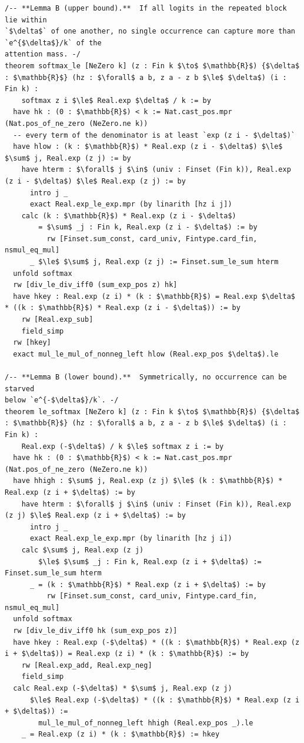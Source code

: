 \documentclass[11pt]{article}
\begin{document}
\begin{lstlisting}
/-- **Lemma B (upper bound).**  If all logits in the repeated block lie within
`$\delta$` of one another, no single occurrence can capture more than `e^{$\delta$}/k` of the
attention mass. -/
theorem softmax_le [NeZero k] (z : Fin k $\to$ $\mathbb{R}$) {$\delta$ : $\mathbb{R}$} (hz : $\forall$ a b, z a - z b $\le$ $\delta$) (i : Fin k) :
    softmax z i $\le$ Real.exp $\delta$ / k := by
  have hk : (0 : $\mathbb{R}$) < k := Nat.cast_pos.mpr (Nat.pos_of_ne_zero (NeZero.ne k))
  -- every term of the denominator is at least `exp (z i - $\delta$)`
  have hlow : (k : $\mathbb{R}$) * Real.exp (z i - $\delta$) $\le$ $\sum$ j, Real.exp (z j) := by
    have hterm : $\forall$ j $\in$ (univ : Finset (Fin k)), Real.exp (z i - $\delta$) $\le$ Real.exp (z j) := by
      intro j _
      exact Real.exp_le_exp.mpr (by linarith [hz i j])
    calc (k : $\mathbb{R}$) * Real.exp (z i - $\delta$)
        = $\sum$ _j : Fin k, Real.exp (z i - $\delta$) := by
          rw [Finset.sum_const, card_univ, Fintype.card_fin, nsmul_eq_mul]
      _ $\le$ $\sum$ j, Real.exp (z j) := Finset.sum_le_sum hterm
  unfold softmax
  rw [div_le_div_iff0 (sum_exp_pos z) hk]
  have hkey : Real.exp (z i) * (k : $\mathbb{R}$) = Real.exp $\delta$ * ((k : $\mathbb{R}$) * Real.exp (z i - $\delta$)) := by
    rw [Real.exp_sub]
    field_simp
  rw [hkey]
  exact mul_le_mul_of_nonneg_left hlow (Real.exp_pos $\delta$).le

/-- **Lemma B (lower bound).**  Symmetrically, no occurrence can be starved
below `e^{-$\delta$}/k`. -/
theorem le_softmax [NeZero k] (z : Fin k $\to$ $\mathbb{R}$) {$\delta$ : $\mathbb{R}$} (hz : $\forall$ a b, z a - z b $\le$ $\delta$) (i : Fin k) :
    Real.exp (-$\delta$) / k $\le$ softmax z i := by
  have hk : (0 : $\mathbb{R}$) < k := Nat.cast_pos.mpr (Nat.pos_of_ne_zero (NeZero.ne k))
  have hhigh : $\sum$ j, Real.exp (z j) $\le$ (k : $\mathbb{R}$) * Real.exp (z i + $\delta$) := by
    have hterm : $\forall$ j $\in$ (univ : Finset (Fin k)), Real.exp (z j) $\le$ Real.exp (z i + $\delta$) := by
      intro j _
      exact Real.exp_le_exp.mpr (by linarith [hz j i])
    calc $\sum$ j, Real.exp (z j)
        $\le$ $\sum$ _j : Fin k, Real.exp (z i + $\delta$) := Finset.sum_le_sum hterm
      _ = (k : $\mathbb{R}$) * Real.exp (z i + $\delta$) := by
          rw [Finset.sum_const, card_univ, Fintype.card_fin, nsmul_eq_mul]
  unfold softmax
  rw [div_le_div_iff0 hk (sum_exp_pos z)]
  have hkey : Real.exp (-$\delta$) * ((k : $\mathbb{R}$) * Real.exp (z i + $\delta$)) = Real.exp (z i) * (k : $\mathbb{R}$) := by
    rw [Real.exp_add, Real.exp_neg]
    field_simp
  calc Real.exp (-$\delta$) * $\sum$ j, Real.exp (z j)
      $\le$ Real.exp (-$\delta$) * ((k : $\mathbb{R}$) * Real.exp (z i + $\delta$)) :=
        mul_le_mul_of_nonneg_left hhigh (Real.exp_pos _).le
    _ = Real.exp (z i) * (k : $\mathbb{R}$) := hkey
\end{lstlisting}
\end{document}
